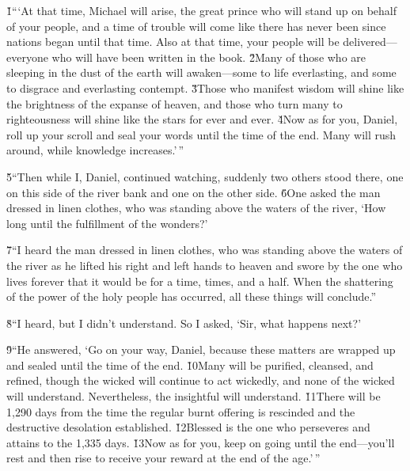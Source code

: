 \v{1}```At that time, Michael will arise, the great prince who will stand up on behalf of your people, and a time of trouble will come like there has never been since nations began until that time. Also at that time, your people will be delivered---everyone who will have been written in the book. \v{2}Many of those who are sleeping in the dust of the earth will awaken---some to life everlasting, and some to disgrace and everlasting contempt. \v{3}Those who manifest wisdom will shine like the brightness of the expanse of heaven, and those who turn many to righteousness will shine like the stars for ever and ever. \v{4}Now as for you, Daniel, roll up your scroll and seal your words until the time of the end. Many will rush around, while knowledge increases.'\,''

\v{5}``Then while I, Daniel, continued watching, suddenly two others stood there, one on this side of the river bank and one on the other side. \v{6}One asked the man dressed in linen clothes, who was standing above the waters of the river, `How long until the fulfillment of the wonders?'

\v{7}``I heard the man dressed in linen clothes, who was standing above the waters of the river as he lifted his right and left hands to heaven and swore by the one who lives forever that it would be for a time, times, and a half. When the shattering of the power of the holy people has occurred, all these things will conclude.''

\v{8}``I heard, but I didn't understand. So I asked, `Sir, what happens next?'

\v{9}``He answered, `Go on your way, Daniel, because these matters are wrapped up and sealed until the time of the end. \v{10}Many will be purified, cleansed, and refined, though the wicked will continue to act wickedly, and none of the wicked will understand. Nevertheless, the insightful will understand. \v{11}There will be 1,290 days from the time the regular burnt offering is rescinded and the destructive desolation established. \v{12}Blessed is the one who perseveres and attains to the 1,335 days. \v{13}Now as for you, keep on going until the end---you'll rest and then rise to receive your reward at the end of the age.'\,''
